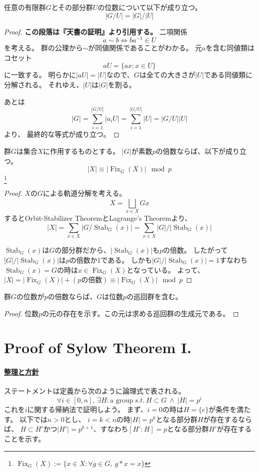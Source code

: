 \documentclass[a4paper]{jarticle}
\newcommand{\Stab}{\operatorname{Stab}}
\newcommand{\Fix}{\operatorname{Fix}}
\newcommand{\ulpar}[1]{\paragraph{\underline{#1}}}
\begin{document}
    \begin{Them}
        任意の有限群$G$とその部分群$U$の位数について以下が成り立つ。
        \[ |G/U|=|G|/|U| \]
    \end{Them}
    \begin{proof}
        \textbf{この段落は『天書の証明』より引用する。}
        二項関係\[ a \sim b \iff ba^{-1} \in U \]を考える。
        群の公理から$\sim$が同値関係であることがわかる。
        元$a$を含む同値類はコセット\[ aU=\{ ax : x \in U \} \]に一致する。
        明らかに$|aU|=|U|$なので、$G$は全ての大きさが$|U|$である同値類に分解される。
        それゆえ、$|U|$は$|G|$を割る。

        あとは
        \[ |G|=\sum_{i=1}^{|G/U|}{|a_i U|}=\sum_{i=1}^{|G/U|}{|U|}=|G/U||U| \]より、
        最終的な等式が成り立つ。
        
    \end{proof}

    \begin{Lemma}
        群$G$は集合$X$に作用するものとする。
        $|G|$が素数$p$の倍数ならば、以下が成り立つ。
        \[ |X| \equiv |\Fix_G(X)| \mod p\]
        \footnote{$\Fix_G(X):=\{x \in X : \forall g \in G,~ g \ast x=x \}$}
    \end{Lemma}
    \begin{proof}
        $X$の$G$による軌道分解を考える。
        \[ X= \bigsqcup_{x \in X}{Gx} \]
        するとOrbit-Stabilizer TheoremとLagrange's Theoremより、
        \[ |X| = \sum_{x \in X}{|G/ \Stab_G(x)|} = \sum_{x \in X}{|G|/|\Stab_G(x)|}\]

        $\Stab_G(x)$は$G$の部分群だから、$|\Stab_G(x)|$も$p$の倍数。
        したがって$|G|/|\Stab_G(x)|$は$p$の倍数か1である。
        しかも$|G|/|\Stab_G(x)|=1$すなわち$\Stab_G(x)=G$の時は$x \in \Fix_G(X)$となっている。
        よって、$|X|=|\Fix_G(X)|+(p\mbox{の倍数}) \equiv |\Fix_G(X)| \mod p$
        
    \end{proof}

    \begin{Them}
        群$G$の位数が$p$の倍数ならば、$G$は位数$p$の巡回群を含む。
    \end{Them}
    \begin{proof}
        位数$p$の元の存在を示す。この元は求める巡回群の生成元である。
    \end{proof}

\section{Proof of Sylow Theorem I.}
    \ulpar{整理と方針}
    ステートメントは定義から次のように論理式で表される。
    \[ \forall i \in [0, n],~ \exists H : \mbox{a group} ~s.t.~ H \subset G ~\wedge~ |H|=p^i \]
    これを$i$に関する帰納法で証明しよう。
    まず、$i=0$の時は$H=\{e\}$が条件を満たす。
    以下では$n > 0$とし、
    $i=k<n$の時$|H|=p^k$となる部分群$H$が存在するならば、
    $H \subset H'$かつ$|H'|=p^{k+1}$、すなわち$[H':H]=p$となる部分群$H'$が存在することを示す。
\end{document}
